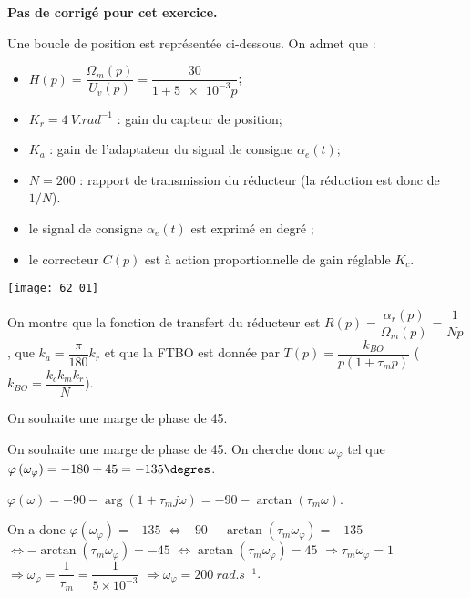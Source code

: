\normaltrue \difficilefalse \tdifficilefalse
\correctiontrue

\setcounter{numques}{0}

\ifcorrection
\else
\textbf{Pas de corrigé pour cet exercice.}
\fi


\ifprof 
\else
Une boucle de position est représentée ci-dessous. On admet que :  
\begin{itemize}
\item $H(p)=\dfrac{\Omega_m(p)}{U_v(p)}=\dfrac{30}{1+\num{5e-3}p}$;
\item $K_r = \SI{4}{V.rad^{-1}}$ : gain du capteur de position;
\item $K_a$ : gain de l’adaptateur du signal de consigne $\alpha_e(t)$; 
\item $N=200$ : rapport de transmission du réducteur (la réduction est donc de $1/N$).
\item le signal de consigne $\alpha_e(t)$ est exprimé en degré ; 
\item le correcteur $C(p)$ est à action proportionnelle de gain réglable $K_c$. 
\end{itemize}


\begin{center}
\texttt{[image: 62\_01]}
\end{center}
 \fi
 
 
 On montre que la fonction de transfert du réducteur est $R(p)=\dfrac{\alpha_r(p)}{\Omega_m(p)}=\dfrac{1}{Np}$, que  $k_a=\dfrac{\pi}{180}k_r$ et que la FTBO est donnée par $T(p)=\dfrac{k_{BO}}{p\left(1+\tau_m p\right)}$ ($k_{BO}=\dfrac{k_c k_m k_r}{N}$).
 
 
 On souhaite une marge de phase de 45\degres.
 
\ifprof
On souhaite une marge de phase de 45\degres. On cherche donc $\omega_{\varphi}$ tel que 
$\varphi\left(\omega_{\varphi}\right)=-180+45 = -135\degres$.

$\varphi(\omega)=-90-\arg\left(1+\tau_m j \omega \right) =-90-\arctan\left(\tau_m  \omega \right)  $.

On a donc $\varphi\left(\omega_{\varphi}\right)=-135$
$\Leftrightarrow -90-\arctan\left(\tau_m  \omega_{\varphi}\right)  = -135 $
$\Leftrightarrow -\arctan\left(\tau_m  \omega_{\varphi} \right)  = -45 $
$\Leftrightarrow \arctan\left(\tau_m  \omega_{\varphi} \right)  = 45 $
$\Rightarrow \tau_m  \omega_{\varphi} = 1 $
$\Rightarrow \omega_{\varphi}  = \dfrac{1}{\tau_m}= \dfrac{1}{5\times 10^{-3}}$
$\Rightarrow \omega_{\varphi}  = \SI{200}{rad.s^{-1}}$.


